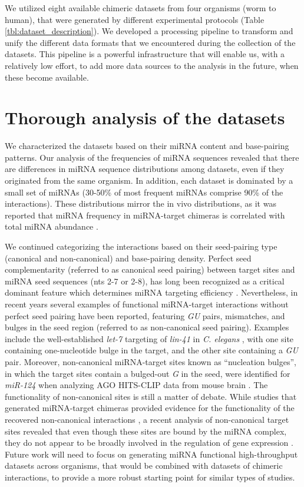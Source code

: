 We utilized eight available chimeric datasets from four organisms (worm to human), that were generated by different experimental protocols (Table \ref{tbl:dataset_description}). We developed a processing pipeline to transform and unify the different data formats that we encountered during the collection of the datasets. This pipeline is a powerful infrastructure that will enable us, with a relatively low effort, to add more data sources to the analysis in the future, when these become available. 

\section{Thorough analysis of the datasets}
We characterized the datasets based on their miRNA content and base-pairing patterns.
Our analysis of the frequencies of miRNA sequences revealed that there are differences in miRNA sequence distributions among datasets, even if they originated from the same organism. In addition, each dataset is dominated by a small set of miRNAs (30-50\% of most frequent miRNAs comprise 90\% of the interactions). These distributions mirror the in vivo distributions, as it was reported that miRNA frequency in miRNA-target chimeras is correlated with total miRNA abundance \cite{darnell_moore2015mirna}.

We continued categorizing the interactions based on their seed-pairing type (canonical and non-canonical) and base-pairing density. Perfect seed complementarity (referred to as canonical seed pairing) between target sites and miRNA seed sequences (nts 2-7 or 2-8), has long been recognized as a critical dominant feature which determines miRNA targeting efficiency \cite{bartel2009micrornas, lewis2005conserved, schirle2014structural}. Nevertheless, in recent years several examples of functional miRNA-target interactions without perfect seed pairing have been reported, featuring \textit{GU} pairs, mismatches, and bulges in the seed region (referred to as non-canonical seed pairing). Examples include the well-established \textit{let-7} targeting of \textit{lin-41} in \textit{C. elegans} \cite{slack2000lin, vella2004c}, with one site containing one-nucleotide bulge in the target, and the other site containing a \textit{GU} pair. Moreover, non-canonical miRNA-target sites known as “nucleation bulges”, in which the target sites contain a bulged-out \textit{G} in the seed, were identified for \textit{miR-124} when analyzing AGO HITS-CLIP data from mouse brain \cite{chi2012alternative}. The functionality of non-canonical sites is still a matter of debate. While studies that generated miRNA-target chimeras provided evidence for the functionality of the recovered non-canonical interactions \cite{helwak2013mapping,grosswendt2014unambiguous}, a recent analysis of non-canonical target sites revealed that even though these sites are bound by the miRNA complex, they do not appear to be broadly involved in the regulation of gene expression \cite{agarwal2015predicting}. Future work will need to focus on generating miRNA functional high-throughput datasets \cite{soriano2019functional} across organisms, that would be combined with datasets of chimeric interactions, to provide a more robust starting point for similar types of studies.


